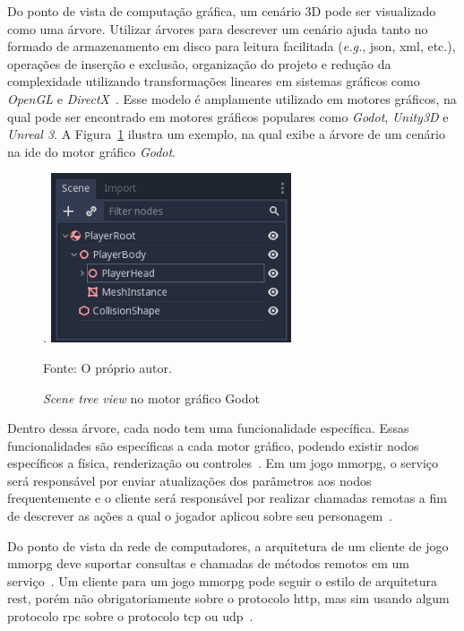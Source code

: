 Do ponto de vista de computação gráfica, um cenário 3D pode ser visualizado como uma árvore.
%
Utilizar árvores para descrever um cenário ajuda tanto no formado de armazenamento em disco para leitura facilitada (\textit{e.g.}, \ac{json}, \ac{xml}, etc.), operações de inserção e exclusão, organização do projeto e redução da complexidade utilizando transformações lineares em sistemas gráficos como \textit{OpenGL} e \textit{DirectX}~\cite{Lengyel2011Jun}.
%
Esse modelo é amplamente utilizado em motores gráficos, na qual pode ser encontrado em motores gráficos populares como \textit{Godot}, \textit{Unity3D} e \textit{Unreal 3}.
%
A Figura~\ref{fig:scene_tree} ilustra um exemplo, na qual exibe a árvore de um cenário na \ac{ide} do motor gráfico \textit{Godot}.



\begin{figure}[htb!]
\caption{\textit{Scene tree view} no motor gráfico Godot}.
\label{fig:scene_tree}
\includegraphics[height=5cm]{img/cap2/scene_tree.png}
\centering

Fonte: O próprio autor.
\end{figure}



Dentro dessa árvore, cada nodo tem uma funcionalidade específica.
%
Essas funcionalidades são específicas a cada motor gráfico, podendo existir nodos específicos a física, renderização ou controles~\cite{godot_docs}.
%
Em um jogo \ac{mmorpg}, o serviço será responsável por enviar atualizações dos parâmetros aos nodos frequentemente e o cliente será responsável por realizar chamadas remotas a fim de descrever as ações a qual o jogador aplicou sobre seu personagem~\cite{photon_engine}.


Do ponto de vista da rede de computadores, a arquitetura de um cliente de jogo \ac{mmorpg} deve suportar consultas e chamadas de métodos remotos em um serviço~\cite{albion_online_unite}.
%
Um cliente para um jogo \ac{mmorpg} pode seguir o estilo de arquitetura \ac{rest}, porém não obrigatoriamente sobre o protocolo \ac{http}, mas sim usando algum protocolo \ac{rpc} sobre o protocolo \ac{tcp} ou \ac{udp}~\cite{albion_online_unite, stephenclarkewillson2017}.


